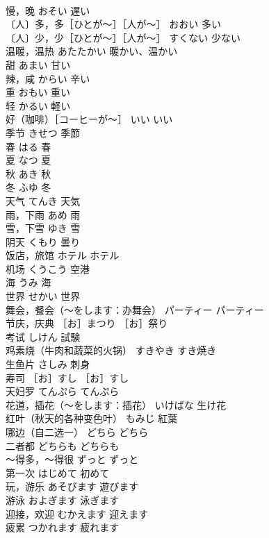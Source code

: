 \documentclass[8pt]{extreport}
\begin{document}
\begin{CJK}{UTF8}{min}
\\	慢，晚	おそい	遅い
\\	〔人〕多，多［ひとが～］［人が～］	おおい	多い
\\	〔人〕少，少［ひとが～］［人が～］	すくない	少ない
\\	温暖，温热	あたたかい	暖かい、温かい
\\	甜	あまい	甘い
\\	辣，咸	からい	辛い
\\	重	おもい	重い
\\	轻	かるい	軽い
\\	好（咖啡）［コーヒーが～］	いい	いい
\\	季节	きせつ	季節
\\	春	はる	春
\\	夏	なつ	夏
\\	秋	あき	秋
\\	冬	ふゆ	冬
\\	天气	てんき	天気
\\	雨，下雨	あめ	雨
\\	雪，下雪	ゆき	雪
\\	阴天	くもり	曇り
\\	饭店，旅馆	ホテル	ホテル
\\	机场	くうこう	空港
\\	海	うみ	海
\\	世界	せかい	世界
\\	舞会，餐会（～をします：办舞会）	パーティー	パーティー
\\	节庆，庆典	［お］まつり	［お］祭り
\\	考试	しけん	試験
\\	鸡素烧（牛肉和蔬菜的火锅）	すきやき	すき焼き
\\	生鱼片	さしみ	刺身
\\	寿司	［お］すし	［お］すし
\\	天妇罗	てんぷら	てんぷら
\\	花道，插花（～をします：插花）	いけばな	生け花
\\	红叶（秋天的各种变色叶）	もみじ	紅葉
\\	哪边（自二选一）	どちら	どちら
\\	二者都	どちらも	どちらも
\\	～得多，～得很	ずっと	ずっと
\\	第一次	はじめて	初めて
\\	玩，游乐	あそびます	遊びます
\\	游泳	およぎます	泳ぎます
\\	迎接，欢迎	むかえます	迎えます
\\	疲累	つかれます	疲れます

\end{CJK}
\end{document}
